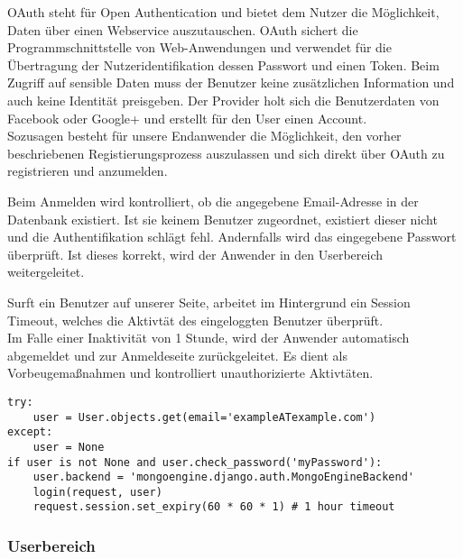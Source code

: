 OAuth steht für Open Authentication und bietet dem Nutzer die Möglichkeit, Daten über einen Webservice auszutauschen. \grqq{}OAuth sichert die Programmschnittstelle von Web-Anwendungen und verwendet für die Übertragung der Nutzeridentifikation dessen Passwort und einen Token\grqq{}\cite{OAUTH}. Beim Zugriff auf sensible Daten muss der Benutzer keine zusätzlichen Information und auch keine Identität preisgeben. Der Provider holt sich die Benutzerdaten von Facebook oder Google+ und erstellt für den User einen Account.\\
Sozusagen besteht für unsere Endanwender die Möglichkeit, den vorher beschriebenen Registierungsprozess auszulassen und sich direkt über OAuth zu registrieren und anzumelden.


Beim Anmelden wird kontrolliert, ob die angegebene Email-Adresse in der Datenbank existiert. Ist sie keinem Benutzer zugeordnet, existiert dieser nicht und die Authentifikation schlägt fehl. Andernfalls wird das eingegebene Passwort überprüft. Ist dieses korrekt, wird der Anwender in den Userbereich weitergeleitet.

Surft ein Benutzer auf unserer Seite, arbeitet im Hintergrund ein Session Timeout, welches die Aktivtät des eingeloggten Benutzer überprüft.\\
Im Falle einer Inaktivität von 1 Stunde, wird der Anwender automatisch abgemeldet und zur Anmeldeseite zurückgeleitet. Es dient als Vorbeugemaßnahmen und kontrolliert unauthorizierte Aktivtäten.

\begin{lstlisting}[caption={Session Timeout}]
try:
    user = User.objects.get(email='exampleATexample.com')
except:
    user = None
if user is not None and user.check_password('myPassword'):
    user.backend = 'mongoengine.django.auth.MongoEngineBackend'
    login(request, user)
    request.session.set_expiry(60 * 60 * 1) # 1 hour timeout
\end{lstlisting}
\newpage 

\subsubsection{Userbereich}


